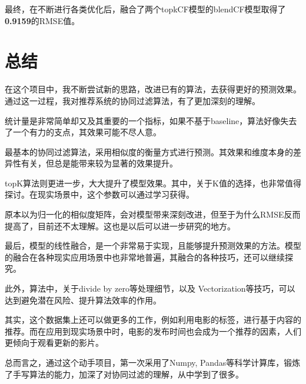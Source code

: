 \documentclass[utf8, a4paper,12pt, onecolumn]{ctexart}
\begin{document}
\begin{spacing}{1.3}
\begin{table}[h]
\end{table}

最终，在不断进行各类优化后，融合了两个topkCF模型的blendCF模型取得了\textbf{0.9159}的RMSE值。

\section{总结}

在这个项目中，我不断尝试新的思路，改进已有的算法，去获得更好的预测效果。通过这一过程，我对推荐系统的协同过滤算法，有了更加深刻的理解。

统计量是非常简单却又及其重要的一个指标，如果不基于baseline，算法好像失去了一个有力的支点，其效果可能不尽人意。

最基本的协同过滤算法，采用相似度的衡量方式进行预测。其效果和维度本身的差异性有关，但总是能带来较为显著的效果提升。

topK算法则更进一步，大大提升了模型效果。其中，关于K值的选择，也非常值得探讨。在现实场景中，这个参数可以通过学习获得。

原本以为归一化的相似度矩阵，会对模型带来深刻改进，但至于为什么RMSE反而提高了，目前还不太理解。这也是以后可以进一步研究的地方。

最后，模型的线性融合，是一个非常易于实现，且能够提升预测效果的方法。模型的融合在各种现实应用场景中也非常地普遍，其融合的各种技巧，还可以继续探究。

此外，算法中，关于divide by zero等处理细节，以及 Vectorization等技巧，可以达到避免潜在风险、提升算法效率的作用。

其实，这个数据集上还可以做更多的工作，例如利用电影的标签，进行基于内容的推荐。而在应用到现实场景中时，电影的发布时间也会成为一个推荐的因素，人们更倾向于观看更新的影片。

总而言之，通过这个动手项目，第一次采用了Numpy, Pandas等科学计算库，锻炼了手写算法的能力，加深了对协同过滤的理解，从中学到了很多。

\renewcommand\refname{参考文献}



\end{spacing}
\end{document}
